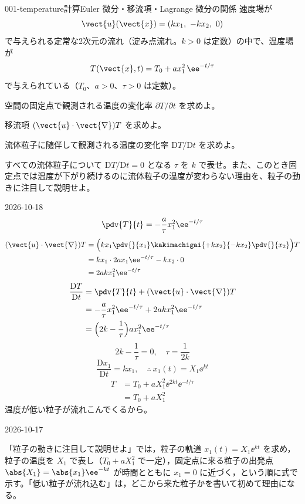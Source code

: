\documentclass[uplatex,dvipdfmx,a4paper,11pt]{jsarticle}
\begin{document}
\mondaihen
{}
\begin{mondai}{001-temperature}{計算}{Euler 微分・移流項・Lagrange 微分の関係}
速度場が
  \[ \vect{u}(\vect{x}) = (kx_1,\ -kx_2,\ 0) \]
  で与えられる定常な2次元の流れ（淀み点流れ。$k>0$ は定数）の中で、温度場が
  \[ T(\vect{x},t) = T_0 + a x_1^{2}\,\ee^{-t/\tau} \]
  で与えられている（$T_0$、$a>0$、$\tau>0$ は定数）。
  \begin{shoumon}
    \item 空間の固定点で観測される温度の変化率 $\partial T/\partial t$ を求めよ。
    \item 移流項 $(\vect{u}\cdot\vect{\nabla})T$ を求めよ。
    \item 流体粒子に随伴して観測される温度の変化率 $\mathrm{D}T/\mathrm{D}t$ を求めよ。
    \item すべての流体粒子について $\mathrm{D}T/\mathrm{D}t = 0$ となる $\tau$ を $k$ で表せ。また、このとき固定点では温度が下がり続けるのに流体粒子の温度が変わらない理由を、粒子の動きに注目して説明せよ。
  \end{shoumon}
\begin{kotaeutsushi}{2026-10-18}
\[ \pdv{T}{t}=-\frac{a}{\tau}x_{1}^{2}\ee^{-t/\tau} \]
\begin{align*}
(\vect{u}\cdot\vect{\nabla})T&=\Bigl(kx_{1}\pdv{}{x_{1}}\kakimachigai{+kx_{2}}{-kx_{2}}\pdv{}{x_{2}}\Bigr)T\\
&=kx_{1}\cdot2ax_{1}\ee^{-t/\tau}-kx_{2}\cdot0\\
&=2akx_{1}^{2}\ee^{-t/\tau}
\end{align*}
\begin{align*}
\frac{\mathrm{D}T}{\mathrm{D}t}&=\pdv{T}{t}+(\vect{u}\cdot\vect{\nabla})T\\
&=-\frac{a}{\tau}x_{1}^{2}\ee^{-t/\tau}+2akx_{1}^{2}\ee^{-t/\tau}\\
&=\Bigl(2k-\frac{1}{\tau}\Bigr)ax_{1}^{2}\ee^{-t/\tau}
\end{align*}
\[ 2k-\frac{1}{\tau}=0,\quad \tau=\frac{1}{2k} \]
\[ \frac{\mathrm{D}x_{1}}{\mathrm{D}t}=kx_{1},\quad \therefore\ x_{1}(t)=X_{1}\ee^{kt} \]
\begin{align*}
T&=T_{0}+aX_{1}^{2}\ee^{2kt}\ee^{-t/\tau}\\
&=T_{0}+aX_{1}^{2}
\end{align*}
温度が低い粒子が流れこんでくるから。
\end{kotaeutsushi}
\begin{maekizuki}{2026-10-17}
\item 「粒子の動きに注目して説明せよ」では，粒子の軌道 $x_{1}(t)=X_{1}\ee^{kt}$ を求め，粒子の温度を $X_{1}$ で表し（$T_{0}+aX_{1}^{2}$ で一定），固定点に来る粒子の出発点 $\abs{X_{1}}=\abs{x_{1}}\ee^{-kt}$ が時間とともに $x_{1}=0$ に近づく，という順に式で示す。「低い粒子が流れ込む」は，どこから来た粒子かを書いて初めて理由になる。
\end{maekizuki}
\end{mondai}
\end{document}
